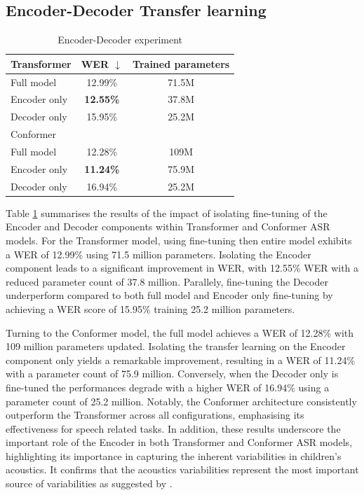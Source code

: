 \subsection{Encoder-Decoder Transfer learning}
\begin{table}
    \begin{center}
        \begin{tabular}{lcc}\hline
            Transformer    &   \ac{WER} $\downarrow$    & Trained parameters  \\ \hline
            Full model          & 12.99\% & 71.5M   \\
            Encoder only & \textbf{12.55\%} & 37.8M  \\
            Decoder only & 15.95\% & 25.2M  \\ \hline \hline
            Conformer    &    & \\ \hline
            Full model          & 12.28\% & 109M   \\
            Encoder only & \textbf{11.24\%} & 75.9M  \\
            Decoder only & 16.94\% & 25.2M  \\ \hline 

        \end{tabular}
    \end{center}
    \caption{Encoder-Decoder experiment}
    \label{tab:EncoderDecoder}
\end{table}
Table \ref{tab:EncoderDecoder} summarises the results of the impact of isolating fine-tuning of the Encoder and Decoder components within Transformer and Conformer \ac{ASR} models. For the Transformer model, using fine-tuning then entire model exhibits a \ac{WER} of 12.99\% using 71.5 million parameters. Isolating the Encoder component leads to a significant improvement in \ac{WER}, with 12.55\% \ac{WER} with a reduced parameter count of 37.8 million. Parallely, fine-tuning the Decoder underperform compared to both full model and Encoder only fine-tuning by achieving a \ac{WER} score of 15.95\% training 25.2 million parameters. 

Turning to the Conformer model, the full model achieves a \ac{WER} of 12.28\% with 109 million parameters updated. Isolating the transfer learning on the Encoder component only  yields a remarkable improvement, resulting in a \ac{WER} of 11.24\% with a parameter count of 75.9 million. Conversely, when the Decoder only is fine-tuned the performances degrade with a higher \ac{WER} of 16.94\% using a parameter count of 25.2 million. Notably, the Conformer architecture consistently outperform the Transformer across all configurations, emphasising its effectiveness for speech related tasks. In addition, these results underscore the important role of the Encoder in both Transformer and Conformer \ac{ASR} models, highlighting its importance in capturing the inherent variabilities in children's acoustics. It confirms that the acoustics variabilities represent the most important source of variabilities as suggested by \cite{TFchildren}.

